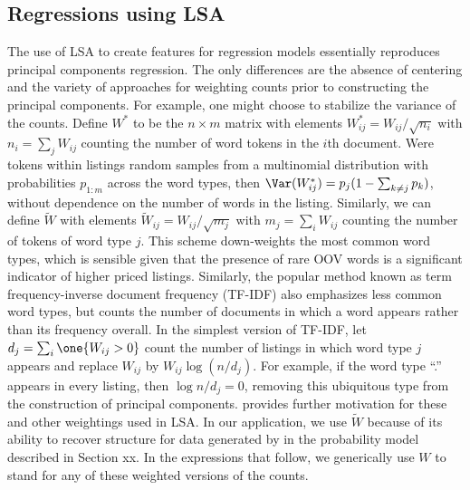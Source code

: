 \documentclass[12pt]{article}
\begin{document}
 \subsection{ Regressions using LSA }  %

The use of LSA to create features for regression models essentially reproduces principal components regression.  The only differences are the absence of centering and the variety of approaches for weighting counts prior to constructing the principal components. For example, one might choose to stabilize the variance of the counts.  Define ${W}^{*}$ to be the $n \times m$ matrix with elements ${W}^{*}_{ij} = W_{ij}/\sqrt{n_i}$ with $n_i = \sum_j W_{ij}$ counting the number of word tokens in the $i$th document.  Were tokens within listings random samples from
 a multinomial distribution with probabilities $p_{1:m}$ across the word types, then $\Var({W}^{*}_{ij}) = p_j(1-\sum_{k\ne j} p_k)$, without dependence on the number of words in the listing. Similarly, we can define $\tilde{W}$ with elements $\tilde{W}_{ij} = W_{ij}/\sqrt{m_j}$ with $m_j = \sum_i W_{ij}$ counting the number of tokens of word type $j$. This scheme down-weights the most common word types, which is sensible given that the presence of rare  OOV words is a significant indicator of higher priced listings.  Similarly, the popular method known as term frequency-inverse document frequency (TF-IDF) also emphasizes less common word types, but counts the number of documents in which a word appears rather than its frequency overall.  In the simplest version of TF-IDF,  let $d_j = \sum _i\one{W_{ij} >
 0}$ count the number of listings in which word type $j$ appears and replace $W_{ij}$ by
 $W_{ij} \log(n/d_j)$.  For example, if the word type ``.'' appears in
 every listing, then $\log n/d_j = 0$, removing this ubiquitous
 type from the construction of principal components.
 \citet{turney10} provides further motivation for these and other weightings used in LSA.
  In our application, we use $\tilde{W}$ because of  its ability to recover structure for data generated by in the probability model described in Section {xx}.  In the expressions that follow, we generically use $W$ to stand for any of these weighted versions of the counts.
 
\end{document}

